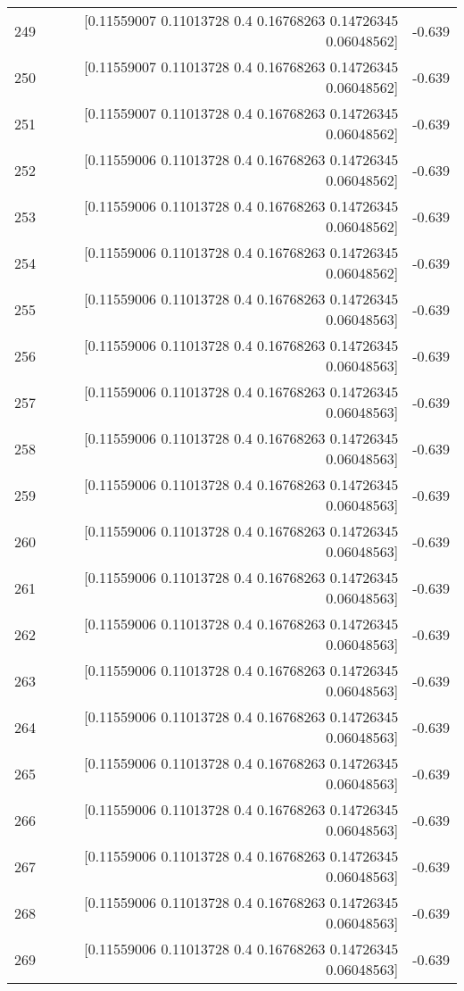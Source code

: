 \begin{longtable}{lrr}
249 & [0.11559007 0.11013728 0.4        0.16768263 0.14726345 0.06048562] & -0.639 \\
250 & [0.11559007 0.11013728 0.4        0.16768263 0.14726345 0.06048562] & -0.639 \\
251 & [0.11559007 0.11013728 0.4        0.16768263 0.14726345 0.06048562] & -0.639 \\
252 & [0.11559006 0.11013728 0.4        0.16768263 0.14726345 0.06048562] & -0.639 \\
253 & [0.11559006 0.11013728 0.4        0.16768263 0.14726345 0.06048562] & -0.639 \\
254 & [0.11559006 0.11013728 0.4        0.16768263 0.14726345 0.06048562] & -0.639 \\
255 & [0.11559006 0.11013728 0.4        0.16768263 0.14726345 0.06048563] & -0.639 \\
256 & [0.11559006 0.11013728 0.4        0.16768263 0.14726345 0.06048563] & -0.639 \\
257 & [0.11559006 0.11013728 0.4        0.16768263 0.14726345 0.06048563] & -0.639 \\
258 & [0.11559006 0.11013728 0.4        0.16768263 0.14726345 0.06048563] & -0.639 \\
259 & [0.11559006 0.11013728 0.4        0.16768263 0.14726345 0.06048563] & -0.639 \\
260 & [0.11559006 0.11013728 0.4        0.16768263 0.14726345 0.06048563] & -0.639 \\
261 & [0.11559006 0.11013728 0.4        0.16768263 0.14726345 0.06048563] & -0.639 \\
262 & [0.11559006 0.11013728 0.4        0.16768263 0.14726345 0.06048563] & -0.639 \\
263 & [0.11559006 0.11013728 0.4        0.16768263 0.14726345 0.06048563] & -0.639 \\
264 & [0.11559006 0.11013728 0.4        0.16768263 0.14726345 0.06048563] & -0.639 \\
265 & [0.11559006 0.11013728 0.4        0.16768263 0.14726345 0.06048563] & -0.639 \\
266 & [0.11559006 0.11013728 0.4        0.16768263 0.14726345 0.06048563] & -0.639 \\
267 & [0.11559006 0.11013728 0.4        0.16768263 0.14726345 0.06048563] & -0.639 \\
268 & [0.11559006 0.11013728 0.4        0.16768263 0.14726345 0.06048563] & -0.639 \\
269 & [0.11559006 0.11013728 0.4        0.16768263 0.14726345 0.06048563] & -0.639 \\

\end{longtable}
